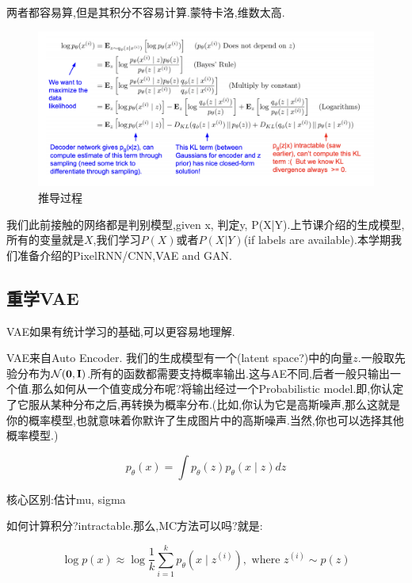 	两者都容易算,但是其积分不容易计算.蒙特卡洛,维数太高.
	
	\begin{figure}[htbp]
		\centering
		\includegraphics[scale=0.65]{figures/VAE.png}
		\caption{推导过程}
		\label{}
	\end{figure}

	
	我们此前接触的网络都是判别模型,given x, 判定y, P(X|Y).上节课介绍的生成模型,所有的变量就是$X$,我们学习$P(X)$或者$P(X|Y)$(if labels are available).本学期我们准备介绍的PixelRNN/CNN,VAE and GAN.
	
	\subsection{重学VAE}
	VAE如果有统计学习的基础,可以更容易地理解.\marginpar{\kaishu }
	
	VAE来自Auto Encoder. 我们的生成模型有一个(latent space?)中的向量$z$.一般取先验分布为$\mathcal{N}(\boldsymbol 0, \bold{I})$.所有的函数都需要支持概率输出.这与AE不同,后者一般只输出一个值.那么如何从一个值变成分布呢?将输出经过一个Probabilistic model.即,你认定了它服从某种分布之后,再转换为概率分布.(比如,你认为它是高斯噪声,那么这就是你的概率模型,也就意味着你默许了生成图片中的高斯噪声.当然,你也可以选择其他概率模型.)
	
	\begin{equation}
		p_{\theta}(x)=\int p_{\theta}(z) p_{\theta}(x \mid z) d z  
	\end{equation}

	核心区别:估计mu, sigma
	
	如何计算积分?intractable.那么,MC方法可以吗?就是:
	
	\begin{equation}
		\log p(x) \approx \log \frac{1}{k} \sum_{i=1}^{k} p_{\theta}\left(x \mid z^{(i)}\right), \text { where } z^{(i)} \sim p(z)
	\end{equation}
	
